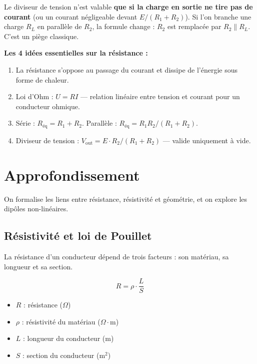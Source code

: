 \documentclass[12pt,a4paper,twoside]{book}
\begin{document}
\begin{attention}
Le diviseur de tension n'est valable \textbf{que si la charge en sortie ne tire pas de courant} (ou un courant négligeable devant $E/(R_1+R_2)$). Si l'on branche une charge $R_L$ en parallèle de $R_2$, la formule change : $R_2$ est remplacée par $R_2 \parallel R_L$. C'est un piège classique.
\end{attention}

\begin{retenir}
\textbf{Les 4 idées essentielles sur la résistance :}
\begin{enumerate}[nosep]
\item La résistance s'oppose au passage du courant et dissipe de l'énergie sous forme de chaleur.
\item Loi d'Ohm : $U = RI$ — relation linéaire entre tension et courant pour un conducteur ohmique.
\item Série : $R_{\text{éq}} = R_1 + R_2$. Parallèle : $R_{\text{éq}} = R_1 R_2 / (R_1 + R_2)$.
\item Diviseur de tension : $V_{\text{out}} = E \cdot R_2/(R_1+R_2)$ — valide uniquement à vide.
\end{enumerate}
\end{retenir}

\section{Approfondissement}

\begin{approfondissement}
On formalise les liens entre résistance, résistivité et géométrie, et on explore les dipôles non-linéaires.
\end{approfondissement}

\subsection{Résistivité et loi de Pouillet}

La résistance d'un conducteur dépend de trois facteurs : son matériau, sa longueur et sa section.

\begin{formule}
\[
\boxed{R = \rho \cdot \frac{L}{S}}
\]
\begin{itemize}[nosep]
\item $R$ : résistance ($\Omega$)
\item $\rho$ : résistivité du matériau ($\Omega\cdot$m)
\item $L$ : longueur du conducteur (m)
\item $S$ : section du conducteur (m$^2$)
\end{itemize}
\end{formule}
\end{document}
